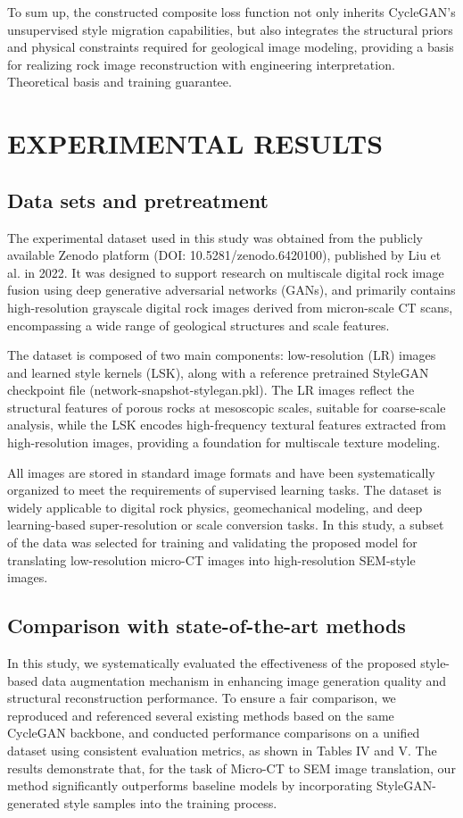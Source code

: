 \documentclass[a4paper,fleqn]{cas-sc}
\begin{document}
To sum up, the constructed composite loss function not only inherits CycleGAN's unsupervised style migration capabilities, but also integrates the structural priors and physical constraints required for geological image modeling, providing a basis for realizing rock image reconstruction with engineering interpretation. Theoretical basis and training guarantee. 


\section{EXPERIMENTAL RESULTS}
\subsection{Data sets and pretreatment}

The experimental dataset used in this study was obtained from the publicly available Zenodo platform (DOI: 10.5281/zenodo.6420100), published by Liu et al. in 2022. It was designed to support research on multiscale digital rock image fusion using deep generative adversarial networks (GANs), and primarily contains high-resolution grayscale digital rock images derived from micron-scale CT scans, encompassing a wide range of geological structures and scale features.

The dataset is composed of two main components: low-resolution (LR) images and learned style kernels (LSK), along with a reference pretrained StyleGAN checkpoint file (network-snapshot-stylegan.pkl). The LR images reflect the structural features of porous rocks at mesoscopic scales, suitable for coarse-scale analysis, while the LSK encodes high-frequency textural features extracted from high-resolution images, providing a foundation for multiscale texture modeling.

All images are stored in standard image formats and have been systematically organized to meet the requirements of supervised learning tasks. The dataset is widely applicable to digital rock physics, geomechanical modeling, and deep learning-based super-resolution or scale conversion tasks. In this study, a subset of the data was selected for training and validating the proposed model for translating low-resolution micro-CT images into high-resolution SEM-style images.





\subsection{Comparison with state-of-the-art methods}
In this study, we systematically evaluated the effectiveness of the proposed style-based data augmentation mechanism in enhancing image generation quality and structural reconstruction performance. To ensure a fair comparison, we reproduced and referenced several existing methods based on the same CycleGAN backbone, and conducted performance comparisons on a unified dataset using consistent evaluation metrics, as shown in Tables IV and V. The results demonstrate that, for the task of Micro-CT to SEM image translation, our method significantly outperforms baseline models by incorporating StyleGAN-generated style samples into the training process.
\end{document}
